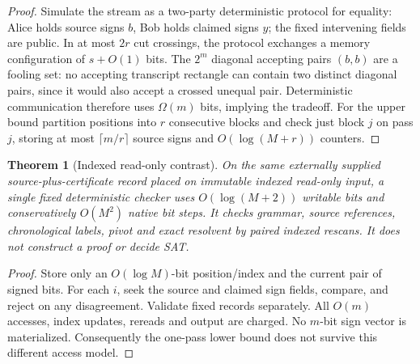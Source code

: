 \documentclass[11pt]{article}
\newtheorem{theorem}{Theorem}
\begin{document}
\begin{proof}
Simulate the stream as a two-party deterministic protocol for equality: Alice holds source signs $b$, Bob holds claimed signs $y$; the fixed intervening fields are public. In at most $2r$ cut crossings, the protocol exchanges a memory configuration of $s+O(1)$ bits. The $2^m$ diagonal accepting pairs $(b,b)$ are a fooling set: no accepting transcript rectangle can contain two distinct diagonal pairs, since it would also accept a crossed unequal pair. Deterministic communication therefore uses $\Omega(m)$ bits, implying the tradeoff. For the upper bound partition positions into $r$ consecutive blocks and check just block $j$ on pass $j$, storing at most $\lceil m/r\rceil$ source signs and $O(\log(M+r))$ counters.
\end{proof}
\begin{theorem}[Indexed read-only contrast]
On the same externally supplied source-plus-certificate record placed on immutable indexed read-only input, a single fixed deterministic checker uses $O(\log(M+2))$ writable bits and conservatively $O(M^2)$ native bit steps. It checks grammar, source references, chronological labels, pivot and exact resolvent by paired indexed rescans. It does not construct a proof or decide SAT.
\end{theorem}
\begin{proof}
Store only an $O(\log M)$-bit position/index and the current pair of signed bits. For each $i$, seek the source and claimed sign fields, compare, and reject on any disagreement. Validate fixed records separately. All $O(m)$ accesses, index updates, rereads and output are charged. No $m$-bit sign vector is materialized. Consequently the one-pass lower bound does not survive this different access model.
\end{proof}
\end{document}
